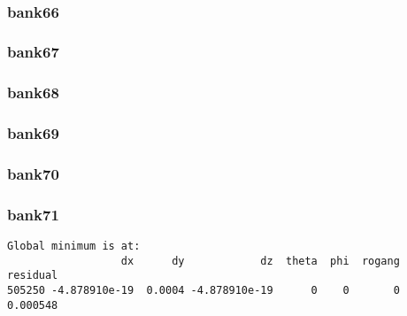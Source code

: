 \documentclass[11pt]{article}
\begin{document}
    \begin{center}
    \end{center}
    { \hspace*{\fill} \\}
    
    \hypertarget{bank66}{%
\subsubsection{bank66}\label{bank66}}

    \hypertarget{bank67}{%
\subsubsection{bank67}\label{bank67}}

    \hypertarget{bank68}{%
\subsubsection{bank68}\label{bank68}}

    \hypertarget{bank69}{%
\subsubsection{bank69}\label{bank69}}

    \hypertarget{bank70}{%
\subsubsection{bank70}\label{bank70}}

    \hypertarget{bank71}{%
\subsubsection{bank71}\label{bank71}}

    \begin{Verbatim}[commandchars=\\\{\}]
Global minimum is at:
                  dx      dy            dz  theta  phi  rogang  residual
505250 -4.878910e-19  0.0004 -4.878910e-19      0    0       0  0.000548
    \end{Verbatim}

    \begin{center}
    \end{center}
    { \hspace*{\fill} \\}
    
\end{document}
